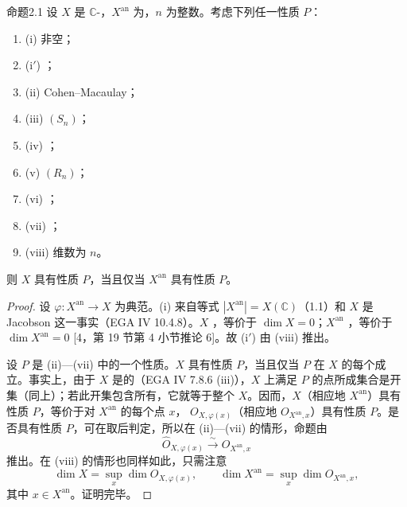 \begin{SGAresult}{命题}{2.1}
设 $X$ 是 $\mathbb C$-，$X^{\mathrm{an}}$ 为，$n$ 为整数。考虑下列任一性质 $P$：
\begin{enumerate}[label={}]
\item (i) 非空；
\item (i$'$) ；
\item (ii) Cohen–Macaulay；
\item (iii) $(S_n)$；
\item (iv) ；
\item (v) $(R_n)$；
\item (vi) ；
\item (vii) ；
\item (viii) 维数为 $n$。
\end{enumerate}
则 $X$ 具有性质 $P$，当且仅当 $X^{\mathrm{an}}$ 具有性质 $P$。
\end{SGAresult}
\begin{proof}
设 $\varphi:X^{\mathrm{an}}\to X$ 为典范。(i) 来自等式 $|X^{\mathrm{an}}|=X(\mathbb C)$（1.1）和 $X$ 是 Jacobson 这一事实（EGA IV 10.4.8）。$X$ ，等价于 $\dim X=0$；$X^{\mathrm{an}}$ ，等价于 $\dim X^{\mathrm{an}}=0$ [4，第 19 节第 4 小节推论 6]。故 (i$'$) 由 (viii) 推出。

设 $P$ 是 (ii)—(vii) 中的一个性质。$X$ 具有性质 $P$，当且仅当 $P$ 在 $X$ 的每个成立。事实上，由于 $X$ 是的（EGA IV 7.8.6 (iii)），$X$ 上满足 $P$ 的点所成集合是开集（同上）；若此开集包含所有，它就等于整个 $X$。因而，$X$（相应地 $X^{\mathrm{an}}$）具有性质 $P$，等价于对 $X^{\mathrm{an}}$ 的每个点 $x$， $O_{X,\varphi(x)}$（相应地 $O_{X^{\mathrm{an}},x}$）具有性质 $P$。是否具有性质 $P$，可在取后判定，所以在 (ii)—(vii) 的情形，命题由
\[
\widehat O_{X,\varphi(x)}\xrightarrow{\sim}\widehat O_{X^{\mathrm{an}},x}
\]
推出。在 (viii) 的情形也同样如此，只需注意
\[
\dim X=\sup_x\dim O_{X,\varphi(x)},\qquad
\dim X^{\mathrm{an}}=\sup_x\dim O_{X^{\mathrm{an}},x},
\]
其中 $x\in X^{\mathrm{an}}$。证明完毕。
\end{proof}

